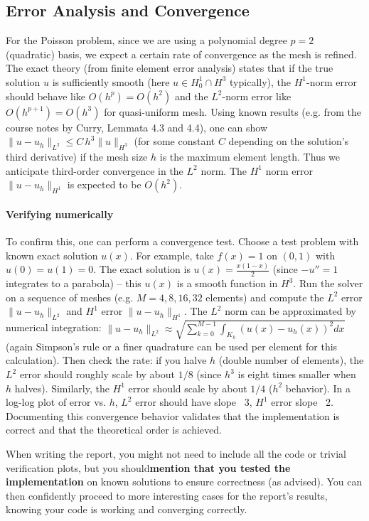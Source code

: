 \documentclass[a4paper,10pt]{report}
\begin{document}
\subsection{Error Analysis and Convergence}
For the Poisson problem, since we are using a polynomial degree \(p=2\) (quadratic) basis, we expect a certain rate of convergence as the mesh is refined.
The exact theory (from finite element error analysis) states that if the true solution \(u\) is sufficiently smooth (here \(u\in H^1_0\cap H^3\) typically), the \(H^1\)-norm error should behave like \(O(h^p) = O(h^2)\) and the \(L^2\)-norm error like \(O(h^{p+1}) = O(h^3)\) for quasi-uniform mesh.
Using known results (e.g. from the course notes by Curry, Lemmata 4.3 and 4.4), one can show \(\|u - u_h\|_{L^2} \le C\,h^3 \|u\|_{H^3}\) (for some constant \(C\) depending on the solution's third derivative) if the mesh size \(h\) is the maximum element length. Thus we anticipate third-order convergence in the \(L^2\) norm. The \(H^1\) norm error \(\|u-u_h\|_{H^1}\) is expected to be \(O(h^2)\).

\paragraph{Verifying numerically}
To confirm this, one can perform a convergence test.
Choose a test problem with known exact solution \(u(x)\). For example, take \(f(x)=1\) on \((0,1)\) with \(u(0)=u(1)=0\). The exact solution is \(u(x) = \frac{x(1-x)}{2}\) (since \(-u''=1\) integrates to a parabola) – this \(u(x)\) is a smooth function in \(H^3\). Run the solver on a sequence of meshes (e.g. \(M=4,8,16,32\) elements) and compute the \(L^2\) error \(\|u - u_h\|_{L^2}\) and \(H^1\) error \(\|u-u_h\|_{H^1}\). The \(L^2\) norm can be approximated by numerical integration: \(\|u - u_h\|_{L^2} \approx \sqrt{\sum_{k=0}^{M-1}\int_{K_k} (u(x)-u_h(x))^2 dx}\) (again Simpson's rule or a finer quadrature can be used per element for this calculation). Then check the rate: if you halve \(h\) (double number of elements), the \(L^2\) error should roughly scale by about \(1/8\) (since \(h^3\) is eight times smaller when \(h\) halves). Similarly, the \(H^1\) error should scale by about \(1/4\) (\(h^2\) behavior). In a log-log plot of error vs. \(h\), \(L^2\) error should have slope ~3, \(H^1\) error slope ~2. Documenting this convergence behavior validates that the implementation is correct and that the theoretical order is achieved.

When writing the report, you might not need to include all the code or trivial verification plots, but you should\textbf{mention that you tested the implementation} on known solutions to ensure correctness (as advised).
You can then confidently proceed to more interesting cases for the report's results, knowing your code is working and converging correctly.
\end{document}
